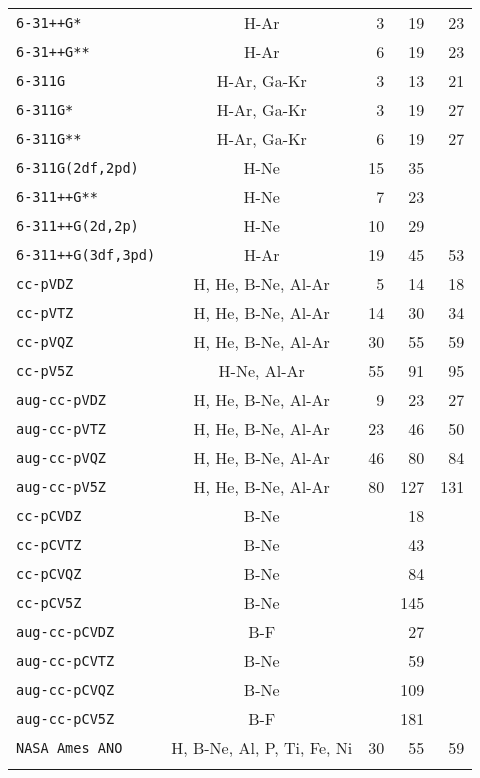 \begin{latexonly}
\begin{longtable}{lcrrr}
\verb*|6-31++G*| & H-Ar & 3 & 19 & 23 \\
\verb*|6-31++G**| & H-Ar & 6 & 19 & 23 \\
\verb*|6-311G| & H-Ar, Ga-Kr & 3 & 13 & 21 \\
\verb*|6-311G*| & H-Ar, Ga-Kr & 3 & 19 & 27 \\
\verb*|6-311G**| & H-Ar, Ga-Kr & 6 & 19 & 27 \\
\verb*|6-311G(2df,2pd)| & H-Ne & 15 & 35 &  \\
\verb*|6-311++G**| & H-Ne & 7 & 23 &  \\
\verb*|6-311++G(2d,2p)| & H-Ne & 10 & 29 &  \\
\verb*|6-311++G(3df,3pd)| & H-Ar & 19 & 45 & 53 \\
\verb*|cc-pVDZ| & H, He, B-Ne, Al-Ar & 5 & 14 & 18 \\
\verb*|cc-pVTZ| & H, He, B-Ne, Al-Ar & 14 & 30 & 34 \\
\verb*|cc-pVQZ| & H, He, B-Ne, Al-Ar & 30 & 55 & 59 \\
\verb*|cc-pV5Z| & H-Ne, Al-Ar & 55 & 91 & 95 \\
\verb*|aug-cc-pVDZ| & H, He, B-Ne, Al-Ar & 9 & 23 & 27 \\
\verb*|aug-cc-pVTZ| & H, He, B-Ne, Al-Ar & 23 & 46 & 50 \\
\verb*|aug-cc-pVQZ| & H, He, B-Ne, Al-Ar & 46 & 80 & 84 \\
\verb*|aug-cc-pV5Z| & H, He, B-Ne, Al-Ar & 80 & 127 & 131 \\
\verb*|cc-pCVDZ| & B-Ne &  & 18 &  \\
\verb*|cc-pCVTZ| & B-Ne &  & 43 &  \\
\verb*|cc-pCVQZ| & B-Ne &  & 84 &  \\
\verb*|cc-pCV5Z| & B-Ne &  & 145 &  \\
\verb*|aug-cc-pCVDZ| & B-F &  & 27 &  \\
\verb*|aug-cc-pCVTZ| & B-Ne &  & 59 &  \\
\verb*|aug-cc-pCVQZ| & B-Ne &  & 109 &  \\
\verb*|aug-cc-pCV5Z| & B-F &  & 181 &  \\
\verb*|NASA Ames ANO| & H, B-Ne, Al, P, Ti, Fe, Ni & 30 & 55 & 59 \\
\label{basissets}
\end{longtable}
\end{latexonly}

